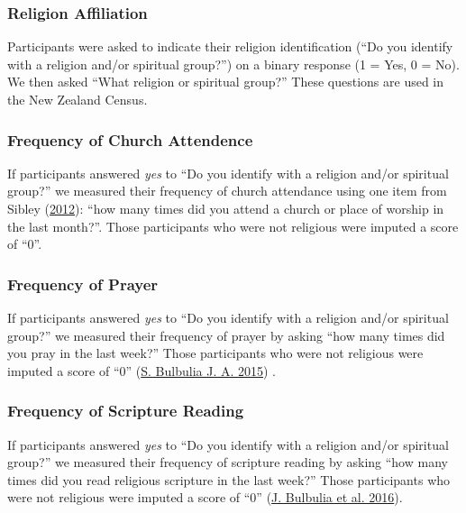 \documentclass[
  singlecolumn]{report}
\begin{document}
\hypertarget{religion-affiliation}{%
\subsubsection{Religion Affiliation}\label{religion-affiliation}}

Participants were asked to indicate their religion identification (``Do
you identify with a religion and/or spiritual group?'') on a binary
response (1 = Yes, 0 = No). We then asked ``What religion or spiritual
group?'' These questions are used in the New Zealand Census.

\hypertarget{frequency-of-church-attendence}{%
\subsubsection{Frequency of Church
Attendence}\label{frequency-of-church-attendence}}

If participants answered \emph{yes} to ``Do you identify with a religion
and/or spiritual group?'' we measured their frequency of church
attendance using one item from Sibley
(\protect\hyperlink{ref-sibley2012}{2012}): ``how many times did you
attend a church or place of worship in the last month?''. Those
participants who were not religious were imputed a score of ``0''.

\hypertarget{frequency-of-prayer}{%
\subsubsection{Frequency of Prayer}\label{frequency-of-prayer}}

If participants answered \emph{yes} to ``Do you identify with a religion
and/or spiritual group?'' we measured their frequency of prayer by
asking ``how many times did you pray in the last week?'' Those
participants who were not religious were imputed a score of ``0''
(\protect\hyperlink{ref-Bulbulia_2015}{S. Bulbulia J. A. 2015}) .

\hypertarget{frequency-of-scripture-reading}{%
\subsubsection{Frequency of Scripture
Reading}\label{frequency-of-scripture-reading}}

If participants answered \emph{yes} to ``Do you identify with a religion
and/or spiritual group?'' we measured their frequency of scripture
reading by asking ``how many times did you read religious scripture in
the last week?'' Those participants who were not religious were imputed
a score of ``0'' (\protect\hyperlink{ref-bulbulia2016}{J. Bulbulia et
al. 2016}).
\end{document}
